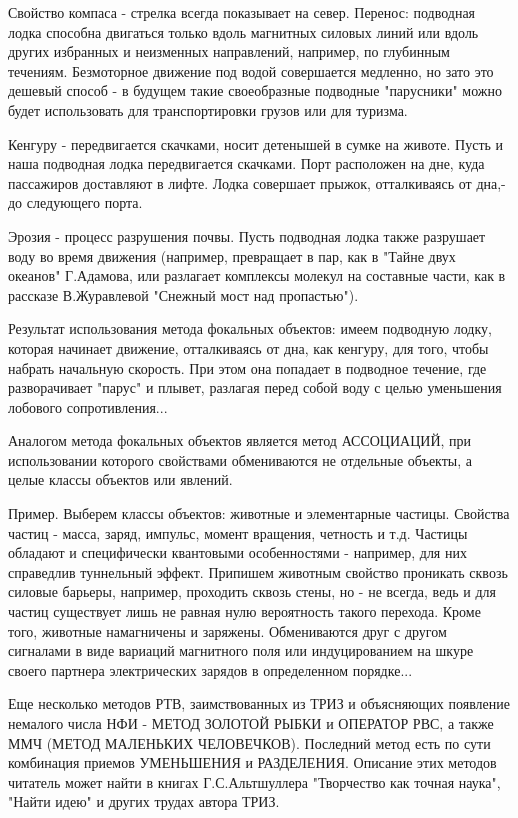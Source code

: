 \documentclass[11pt,a4paper]{article}
\begin{document}
Свойство компаса - стрелка всегда показывает на север. Перенос: подводная лодка способна двигаться только вдоль магнитных силовых линий или вдоль других избранных и неизменных направлений, например, по глубинным течениям. Безмоторное движение под водой совершается медленно, но зато это дешевый способ - в будущем такие своеобразные подводные "парусники" можно будет использовать для транспортировки грузов или для туризма.

Кенгуру - передвигается скачками, носит детенышей в сумке на животе. Пусть и наша подводная лодка передвигается скачками. Порт расположен на дне, куда пассажиров доставляют в лифте. Лодка совершает прыжок, отталкиваясь от дна,- до следующего порта.

Эрозия - процесс разрушения почвы. Пусть подводная лодка также разрушает воду во время движения (например, превращает в пар, как в "Тайне двух океанов" Г.Адамова, или разлагает комплексы молекул на составные части, как в рассказе В.Журавлевой "Снежный мост над пропастью").

Результат использования метода фокальных объектов: имеем подводную лодку, которая начинает движение, отталкиваясь от дна, как кенгуру, для того, чтобы набрать начальную скорость. При этом она попадает в подводное течение, где разворачивает "парус" и плывет, разлагая перед собой воду с целью уменьшения лобового сопротивления...

Аналогом метода фокальных объектов является метод АССОЦИАЦИЙ, при использовании которого свойствами обмениваются не отдельные объекты, а целые классы объектов или явлений.

Пример. Выберем классы объектов: животные и элементарные частицы. Свойства частиц - масса, заряд, импульс, момент вращения, четность и т.д. Частицы обладают и специфически квантовыми особенностями - например, для них справедлив туннельный эффект. Припишем животным свойство проникать сквозь силовые барьеры, например, проходить сквозь стены, но - не всегда, ведь и для частиц существует лишь не равная нулю вероятность такого перехода. Кроме того, животные намагничены и заряжены. Обмениваются друг с другом сигналами в виде вариаций магнитного поля или индуцированием на шкуре своего партнера электрических зарядов в определенном порядке...

Еще несколько методов РТВ, заимствованных из ТРИЗ и объясняющих появление немалого числа НФИ - МЕТОД ЗОЛОТОЙ РЫБКИ и ОПЕРАТОР РВС, а также ММЧ (МЕТОД МАЛЕНЬКИХ ЧЕЛОВЕЧКОВ). Последний метод есть по сути комбинация приемов УМЕНЬШЕНИЯ и РАЗДЕЛЕНИЯ. Описание этих методов читатель может найти в книгах Г.С.Альтшуллера "Творчество как точная наука", "Найти идею" и других трудах автора ТРИЗ.
\end{document}
